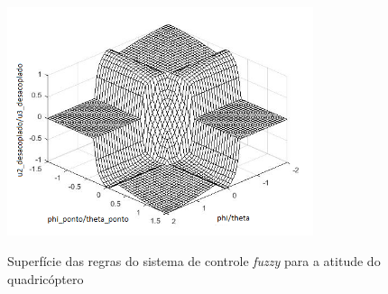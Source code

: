 \begin{figure}[!htb]
    \centering
    \caption{Superfície das regras do sistema de controle \textit{fuzzy} para a atitude do quadricóptero}
    \includegraphics[width=0.8\textwidth]{./04-figuras/figuras_pos_banca/9-refinando-grids/editados/grid_fis_atitude}
    \label{fig:grid_fis_atitude}
\end{figure}


